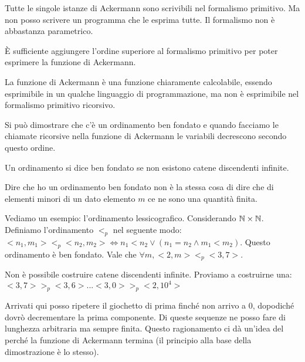 Tutte le singole istanze di Ackermann sono scrivibili nel formalismo primitivo. Ma non posso
scrivere un programma che le esprima tutte. Il formalismo non è abbastanza parametrico.

È sufficiente  aggiungere l'ordine superiore al formalismo primitivo per poter esprimere la
funzione di Ackermann.

La funzione di Ackermann è una funzione chiaramente calcolabile, essendo esprimibile in un qualche
linguaggio di programmazione, ma non è esprimibile nel formalismo primitivo ricorsivo.

Si può dimostrare che c'è un ordinamento ben fondato e quando facciamo le chiamate ricorsive nella
funzione di Ackermann le variabili decrescono secondo questo ordine.

Un ordinamento si dice ben fondato se non esistono catene discendenti infinite.

Dire che ho un ordinamento ben fondato non è la stessa cosa di dire che di elementi minori di un
dato elemento $m$ ce ne sono una quantità finita.

Vediamo un esempio: l'ordinamento lessicografico. Considerando $\mathbb{N} \times \mathbb{N}$. Definiamo
l'ordinamento $<_{p}$ nel seguente modo: $<n_{1},m_{1}> <_{p} <n_{2},m_{2}> \iff n_{1} < n_{2} \lor
(n_{1} = n_{2} \land m_{1} < m_{2})$. Questo ordinamento è ben fondato. Vale che $\forall m, <2,m>
<_{p} <3,7>$.

Non è possibile costruire catene discendenti infinite. Proviamo a costruirne una:
$<3,7> >_{p} <3,6> ... <3,0> >_{p} <2,10^{4}>$

Arrivati qui posso ripetere il giochetto di prima finché non arrivo a 0, dopodiché dovrò
decrementare la prima componente. Di queste sequenze ne posso fare di lunghezza arbitraria ma sempre
finita. Questo ragionamento ci dà un'idea del perché la funzione di Ackermann termina (il
principio alla base della dimostrazione è lo stesso).

